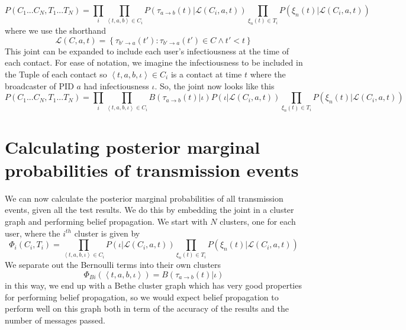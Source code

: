 \documentclass{article}
\begin{document}
\begin{equation}
P(C_1...C_N, T_1...T_N) =
\prod_{i} \prod_{\left< t,a,b \right> \in C_i}
P\left(\tau_{a\rightarrow b}(t)|\mathcal{L}(C_i,a,t) \right)
\prod_{\xi_{n}(t) \in T_i}
P(\xi_{n}(t)|\mathcal{L}(C_i,a,t))
\label{joint}
\end{equation}
where we use the shorthand
\[
\mathcal{L}(C,a,t) =   \left\{ \tau_{b'\rightarrow a}(t'):\tau_{b' \rightarrow a}(t') \in C \wedge t' < t \right\}
\]
This joint can be expanded to include each user's infectiousness at the time of each contact. For ease of notation, we imagine the infectiousness to be included in the Tuple of each contact so $\left<t,a,b,\iota\right> \in C_i$ is a contact at time $t$ where the broadcaster of PID $a$ had infectiousness $\iota$. So, the joint now looks like this
\begin{equation}
P(C_1...C_N, T_1...T_N) =
\prod_{i} \prod_{\left< t,a,b, \iota \right> \in C_i}
B(\tau_{a\rightarrow b}(t)|\iota)
P\left(\iota|\mathcal{L}(C_i,a,t) \right)
\prod_{\xi_{n}(t) \in T_i}
P(\xi_{n}(t)|\mathcal{L}(C_i,a,t))
\label{ijoint}
\end{equation}


\section{Calculating posterior marginal probabilities of transmission events}

We can now calculate the posterior marginal probabilities of all transmission events, given all the test results. We do this by embedding the joint in a cluster graph and performing belief propagation. We start with $N$ clusters, one for each user, where the $i^{th}$ cluster is given by
\begin{equation}
\Phi_i(C_i, T_i) =
\prod_{\left< t,a,b, \iota \right> \in C_i}
P\left(\iota|\mathcal{L}(C_i,a,t) \right)
\prod_{\xi_{n}(t) \in T_i}
P(\xi_{n}(t)|\mathcal{L}(C_i,a,t))
\label{ijoint}
\end{equation}
We separate out the Bernoulli terms into their own clusters
\begin{equation}
\Phi_{Bi}(\left<t,a,b,\iota\right>) = B(\tau_{a\rightarrow b}(t)|\iota)
\end{equation}
in this way, we end up with a Bethe cluster graph which has very good properties for performing belief propagation, so we would expect belief propagation to perform well on this graph both in term of the accuracy of the results and the number of messages passed.
\end{document}
